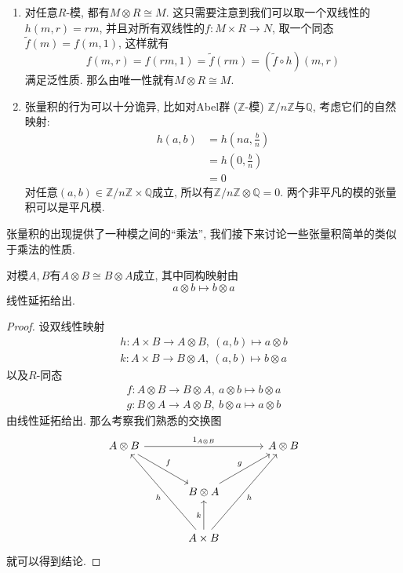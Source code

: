 \begin{eg}\label{eg of tensor product}
    \begin{enumerate}
        \item 对任意$R$-模, 都有$M\otimes R\cong M$.
        这只需要注意到我们可以取一个双线性的$h(m,r)=rm$, 并且对所有双线性的$f:M\times R\to N$, 取一个同态$\widetilde{f}(m)=f(m,1)$,
        这样就有
        \[f(m,r)=f(rm,1)=\widetilde{f}(rm)=(\widetilde{f}\circ h)(m,r)\]
        满足泛性质. 那么由唯一性就有$M\otimes R\cong M$.
        \item 张量积的行为可以十分诡异, 比如对Abel群 ($\mathbb{Z}$-模) $\mathbb{Z}/n\mathbb{Z}$与$\mathbb{Q}$, 考虑它们的自然映射:
        \begin{align*}
            h(a,b)&=h\left(na,\frac{b}{n}\right)\\
            &=h\left(0,\frac{b}{n}\right)\\
            &=0
        \end{align*}
        对任意$(a,b)\in\mathbb{Z}/n\mathbb{Z}\times\mathbb{Q}$成立, 所以有$\mathbb{Z}/n\mathbb{Z}\otimes\mathbb{Q}=0$.
        两个非平凡的模的张量积可以是平凡模.
    \end{enumerate}
\end{eg}

张量积的出现提供了一种模之间的``乘法'', 我们接下来讨论一些张量积简单的类似于乘法的性质.

\begin{prop}[交换律]
    对模$A,B$有$A\otimes B\cong B\otimes A$成立, 其中同构映射由
    \[a\otimes b\mapsto b\otimes a\]
    线性延拓给出.
\end{prop}
\begin{proof}
    设双线性映射
    \begin{gather*}
        h:A\times B\to A\otimes B,\ (a,b)\mapsto a\otimes b\\
        k:A\times B\to B\otimes A,\ (a,b)\mapsto b\otimes a
    \end{gather*}
    以及$R$-同态
    \begin{gather*}
        f:A\otimes B\to B\otimes A,\ a\otimes b\mapsto b\otimes a\\
        g:B\otimes A\to A\otimes B,\ b\otimes a\mapsto a\otimes b
    \end{gather*}
    由线性延拓给出.
    那么考察我们熟悉的交换图
    \[\begin{tikzcd}[sep=large]
        A\otimes B\arrow[rr, "1_{A\otimes B}"] \arrow[dr, "f"] & & A\otimes B\\
        & B\otimes A \arrow[ur, "g"] &\\
        & A\times B \arrow[uul, "h"] \arrow[u, "k"] \arrow[uur, "h"']
    \end{tikzcd}\]
    就可以得到结论.
\end{proof}

